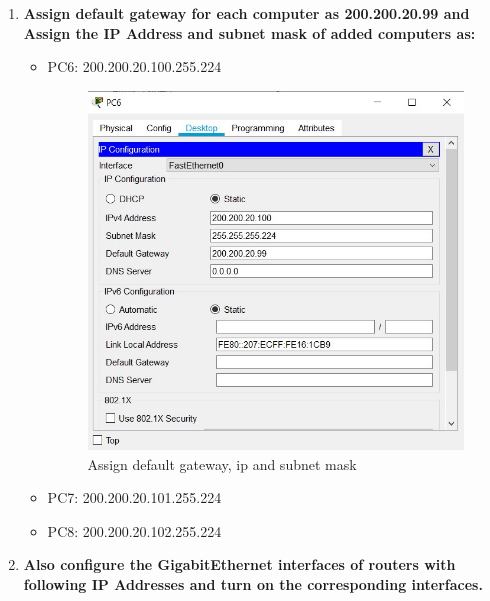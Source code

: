 \documentclass[a4paper,11pt]{article}
\begin{document}
\begin{enumerate}
      \item \textbf{Assign default gateway for each computer as 200.200.20.99 and Assign the IP Address and subnet mask of added computers as:}
            \begin{itemize}
                  \item PC6: 200.200.20.100\quad {}.255.224
                        \begin{figure}[H]
                              \centering
                              \includegraphics[scale=0.75,cframe=blue 0.5pt 3pt]{gate_ip_mask.jpg}
                              \caption{Assign default gateway, ip and subnet mask}
                        \end{figure}
                  \item PC7: 200.200.20.101\quad {}.255.224
                  \item PC8: 200.200.20.102\quad {}.255.224
            \end{itemize}


      \item \textbf{Also configure the GigabitEthernet interfaces of routers with following IP Addresses and turn on the corresponding interfaces.}


\end{enumerate}
\end{document}

